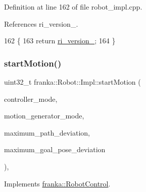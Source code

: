Definition at line 162 of file robot\+\_\+impl.\+cpp.



References ri\+\_\+version\+\_\+.


\begin{DoxyCode}
162                                                            \{
163   \textcolor{keywordflow}{return} \hyperlink{classfranka_1_1Robot_1_1Impl_a9e5d9b45a15e1e23dd09e4d2fe272833}{ri\_version\_};
164 \}
\end{DoxyCode}
\mbox{\label{classfranka_1_1Robot_1_1Impl_a2f4073ded9e7ecc118a93d233c0f6ed7}} 
\subsubsection{\texorpdfstring{start\+Motion()}{startMotion()}}
{\footnotesize\ttfamily uint32\+\_\+t franka\+::\+Robot\+::\+Impl\+::start\+Motion (\begin{DoxyParamCaption}\item[{\hyperlink{structresearch__interface_1_1robot_1_1Move_a3e7b80b30bbf01dc902c84402502ebbc}{research\+\_\+interface\+::robot\+::\+Move\+::\+Controller\+Mode}}]{controller\+\_\+mode,  }\item[{\hyperlink{structresearch__interface_1_1robot_1_1Move_a334b8380507154e8042b57fbd3287c0f}{research\+\_\+interface\+::robot\+::\+Move\+::\+Motion\+Generator\+Mode}}]{motion\+\_\+generator\+\_\+mode,  }\item[{const \hyperlink{structresearch__interface_1_1robot_1_1Move_1_1Deviation}{research\+\_\+interface\+::robot\+::\+Move\+::\+Deviation} \&}]{maximum\+\_\+path\+\_\+deviation,  }\item[{const \hyperlink{structresearch__interface_1_1robot_1_1Move_1_1Deviation}{research\+\_\+interface\+::robot\+::\+Move\+::\+Deviation} \&}]{maximum\+\_\+goal\+\_\+pose\+\_\+deviation }\end{DoxyParamCaption})\hspace{0.3cm}{\ttfamily [override]}, {\ttfamily [virtual]}}



Implements \hyperlink{classfranka_1_1RobotControl_a4a91a5baea3f7edc7eb094ef8208c065}{franka\+::\+Robot\+Control}.



